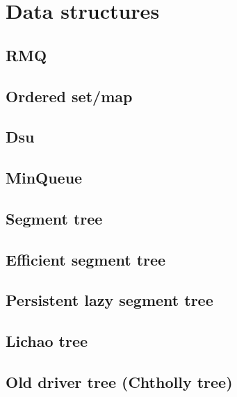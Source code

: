 \section{Data structures}

\subsection{RMQ}

\subsection{Ordered set/map}

\subsection{Dsu}

\subsection{MinQueue}

\subsection{Segment tree}

\subsection{Efficient segment tree}

\subsection{Persistent lazy segment tree}

\subsection{Lichao tree}

\subsection{Old driver tree (Chtholly tree)}

